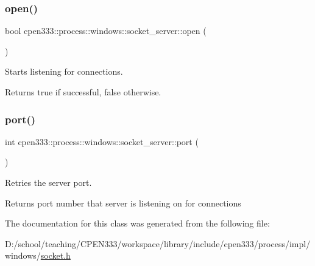 \subsubsection{\texorpdfstring{open()}{open()}}
{\footnotesize\ttfamily bool cpen333\+::process\+::windows\+::socket\+\_\+server\+::open (\begin{DoxyParamCaption}{ }\end{DoxyParamCaption})\hspace{0.3cm}{\ttfamily [inline]}}



Starts listening for connections. 

\begin{DoxyReturn}{Returns}
true if successful, false otherwise. 
\end{DoxyReturn}
\mbox{\label{classcpen333_1_1process_1_1windows_1_1socket__server_a4b5f9231c046f947a77a6458202c2712}} 
\subsubsection{\texorpdfstring{port()}{port()}}
{\footnotesize\ttfamily int cpen333\+::process\+::windows\+::socket\+\_\+server\+::port (\begin{DoxyParamCaption}{ }\end{DoxyParamCaption})\hspace{0.3cm}{\ttfamily [inline]}}



Retries the server port. 

\begin{DoxyReturn}{Returns}
port number that server is listening on for connections 
\end{DoxyReturn}


The documentation for this class was generated from the following file\+:\begin{DoxyCompactItemize}
\item 
D\+:/school/teaching/\+C\+P\+E\+N333/workspace/library/include/cpen333/process/impl/windows/\hyperlink{impl_2windows_2socket_8h}{socket.\+h}\end{DoxyCompactItemize}
